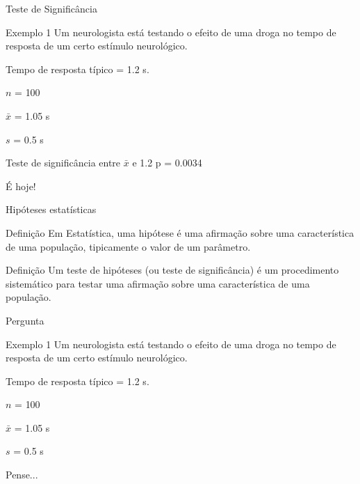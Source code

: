 \documentclass{beamer}
\begin{document}
\begin{frame}{Teste de Significância}
  \begin{exampleblock}{Exemplo 1}
    \scriptsize
    Um neurologista está testando o efeito de uma droga no tempo de
    resposta de um certo estímulo neurológico.

    \smallskip
    Tempo de resposta típico = \alert{1.2 s}.

    \smallskip
    $n$ = \alert{100}

    $\bar{x}$ = \alert{1.05 s}

    $s$ = \alert{0.5 s}

  \end{exampleblock}
  \begin{exampleblock}{Teste de significância entre $\bar{x}$ e 1.2}
      \small
     p = 0.0034
   \end{exampleblock}

   \begin{center}
     \small
     É hoje!
   \end{center}
\end{frame}

\begin{frame}{Hipóteses estatísticas}
  \begin{block}{Definição}
    \small
    Em Estatística, uma \alert{hipótese} é uma afirmação sobre uma
    característica de uma população, tipicamente o valor de um
    parâmetro.
  \end{block}
  \begin{block}{Definição}
    \small
    Um \alert{teste de hipóteses} (ou teste de significância) é um
    procedimento sistemático para testar uma afirmação sobre uma
    característica de uma população.
  \end{block}
\end{frame}

\begin{frame}{Pergunta}
  \begin{exampleblock}{Exemplo 1}
    \scriptsize
    Um neurologista está testando o efeito de uma droga no tempo de
    resposta de um certo estímulo neurológico.

    \smallskip
    Tempo de resposta típico = \alert{1.2 s}.

    \smallskip
    $n$ = \alert{100}

    $\bar{x}$ = \alert{1.05 s}

    $s$ = \alert{0.5 s}
  \end{exampleblock}
  \begin{block}{Pense...}

    \bigskip
  \end{block}
\end{frame}
\end{document}
